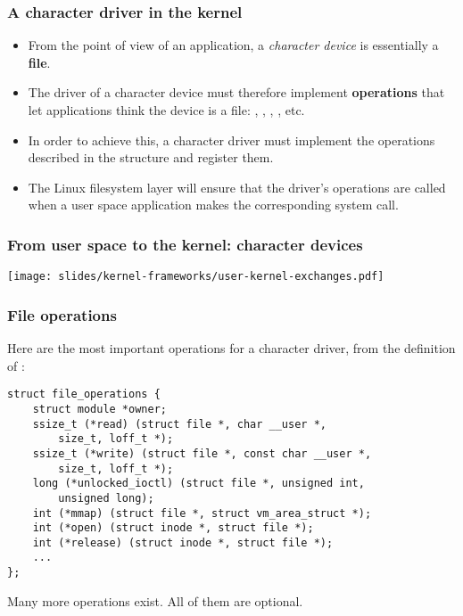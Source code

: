 \begin{frame}
  \frametitle{A character driver in the kernel}
  \begin{itemize}
  \item From the point of view of an application, a {\em character
      device} is essentially a {\bf file}.
  \item The driver of a character device must therefore implement {\bf
      operations} that let applications think the device is a file:
    , , , , etc.
  \item In order to achieve this, a character driver must implement
    the operations described in the 
    structure and register them.
  \item The Linux filesystem layer will ensure that the driver's
    operations are called when a user space application makes the
    corresponding system call.
  \end{itemize}
\end{frame}

\begin{frame}
  \frametitle{From user space to the kernel: character devices}
  \begin{center}
    \texttt{[image: slides/kernel-frameworks/user-kernel-exchanges.pdf]}
  \end{center}
\end{frame}

\begin{frame}[fragile]
  \frametitle{File operations}
  Here are the most important operations for a character
  driver, from the definition of :
\begin{verbatim}
struct file_operations {
    struct module *owner;
    ssize_t (*read) (struct file *, char __user *,
        size_t, loff_t *);
    ssize_t (*write) (struct file *, const char __user *,
        size_t, loff_t *);
    long (*unlocked_ioctl) (struct file *, unsigned int,
        unsigned long);
    int (*mmap) (struct file *, struct vm_area_struct *);
    int (*open) (struct inode *, struct file *);
    int (*release) (struct inode *, struct file *);
    ...
};
\end{verbatim}
Many more operations exist. All of them are optional.
\end{frame}


